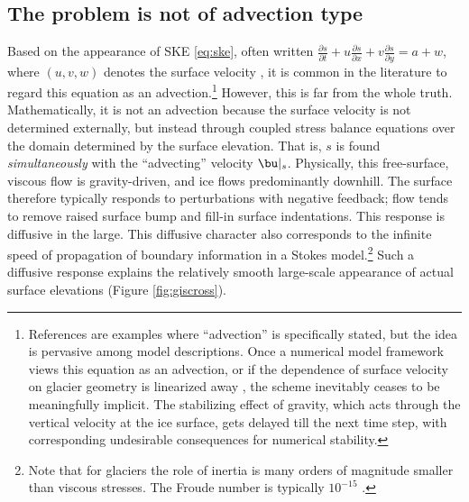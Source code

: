 
\subsection{The problem is not of advection type} \label{subsec:notadv}  Based on the appearance of SKE \eqref{eq:ske}, often written $\frac{\partial s}{\partial t} + u \frac{\partial s}{\partial x} + v \frac{\partial s}{\partial y} = a + w$, where $(u,v,w)$ denotes the surface velocity \cite{GreveBlatter2009,SchoofHewitt2013}, it is common in the literature to regard this equation as an advection.\footnote{References \cite{Chengetal2020,WirbelJarosch2020} are examples where ``advection'' is specifically stated, but the idea is pervasive among model descriptions.  Once a numerical model framework views this equation as an advection, or if the dependence of surface velocity on glacier geometry is linearized away \cite[section 3.5, for example]{Durandetal2009}, the scheme inevitably ceases to be meaningfully implicit.  The stabilizing effect of gravity, which acts through the vertical velocity at the ice surface, gets delayed till the next time step, with corresponding undesirable consequences for numerical stability.}  However, this is far from the whole truth.  Mathematically, it is not an advection because the surface velocity is not determined externally, but instead through coupled stress balance equations over the domain determined by the surface elevation.  That is, $s$ is found \emph{simultaneously} with the ``advecting'' velocity $\bu|_s$.  Physically, this free-surface, viscous flow is gravity-driven, and ice flows predominantly downhill.  The surface therefore typically responds to perturbations with negative feedback; flow tends to remove raised surface bump and fill-in surface indentations.  This response is diffusive in the large.  This diffusive character also corresponds to the infinite speed of propagation of boundary information in a Stokes model.\footnote{Note that for glaciers the role of inertia is many orders of magnitude smaller than viscous stresses.  The Froude number is typically $10^{-15}$ \cite{GreveBlatter2009}.}  Such a diffusive response explains the relatively smooth large-scale appearance of actual surface elevations (Figure \ref{fig:giscross}).

